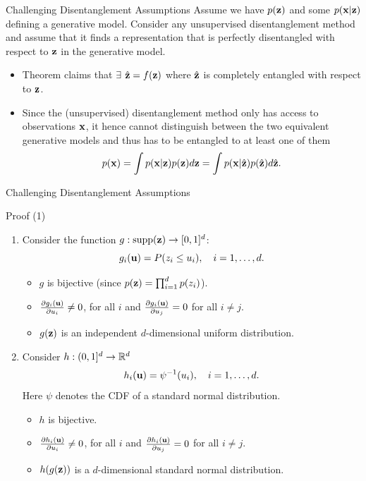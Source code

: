 \begin{frame}{Challenging Disentanglement Assumptions}
Assume we have $p(\mathbf{z})$ and some $p(\mathbf{x}|\mathbf{z})$ defining a generative model. Consider any unsupervised
disentanglement method and assume that it finds a representation that is perfectly disentangled with respect
to $\mathbf{z}$ in the generative model.
\begin{itemize}
	\item Theorem claims that $\exists$ $\hat{\mathbf{z}} = f(\mathbf{z})$ where $\hat{\mathbf{z}}$ is completely entangled
	with respect to $\mathbf{z}$.
	\item Since the (unsupervised) disentanglement method only has access to
	observations $\mathbf{x}$, it hence cannot distinguish between the two equivalent generative models and thus has to be entangled to at least one of them
	\[
	p(\mathbf{x}) = \int p(\mathbf{x} | \mathbf{z}) p(\mathbf{z}) d\mathbf{z} = \int p(\mathbf{x} | \hat{\mathbf{z}})p(\hat{\mathbf{z}}) d \hat{\mathbf{z}}.
	\]
\end{itemize}

\end{frame}
\begin{frame}{Challenging Disentanglement Assumptions}
\begin{block}{Proof (1)}
	\begin{enumerate}
		\item 
		Consider the function $g: \text{supp}(\mathbf{z}) \rightarrow [0, 1]^d$:
		\vspace{-0.1cm}
		\[
		g_i(\mathbf{u}) = P(z_i \leq u_i), \quad i=1, \dots, d.
		\]
		\vspace{-0.4cm}
		\begin{itemize}
			\item $g$ is bijective (since $p(\mathbf{z}) = \prod_{i=1}^dp(z_i)$).
			\item $\frac{\partial g_i(\mathbf{u})}{\partial u_i} \neq 0$, for all $i$ and $\frac{\partial g_i(\mathbf{u})}{\partial u_j} = 0$ for all $i \neq j$.
			\item $g(\mathbf{z})$ is an independent $d$-dimensional uniform distribution.
		\end{itemize}
		\item 
		Consider $h: (0, 1]^d \rightarrow \mathbb{R}^d$
		\[
		h_i(\mathbf{u}) = \psi^{-1}(u_i), \quad i= 1, \dots, d.
		\]
		Here $\psi$  denotes the CDF of a standard normal distribution.
		\begin{itemize}
			\item $h$ is bijective.
			\item $\frac{\partial h_i(\mathbf{u})}{\partial u_i} \neq 0$, for all $i$ and $\frac{\partial h_i(\mathbf{u})}{\partial u_j} = 0$ for all $i \neq j$.
			\item $h(g(\mathbf{z}))$  is a $d$-dimensional standard normal distribution.
		\end{itemize}
	\end{enumerate}
\end{block}

\end{frame}
